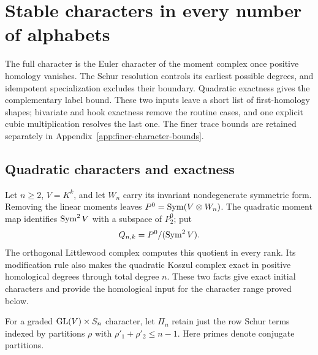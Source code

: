 \section{Stable characters in every number of alphabets}
\label{sec:stable-characters}

The full character is the Euler character of the moment complex once
positive homology vanishes. The Schur resolution controls its earliest
possible degrees, and idempotent specialization excludes their boundary.
Quadratic exactness gives the complementary label bound. These two
inputs leave a short list of first-homology shapes; bivariate and hook
exactness remove the routine cases, and one explicit cubic multiplication
resolves the last one. The finer trace bounds are retained separately in
Appendix~\ref{app:finer-character-bounds}.

\subsection{Quadratic characters and exactness}
\label{sec:quadratic-characters}

Let $n\geq2$, $V=K^k$, and let $W_n$ carry its invariant
nondegenerate symmetric form. Removing the linear moments leaves
$P^0=\operatorname{Sym}(V\otimes W_n)$. The quadratic moment map identifies
$\operatorname{Sym}^2V$ with a subspace of $P^0_2$; put
\[
 Q_{n,k}=P^0/(\operatorname{Sym}^2V).
\]
The orthogonal Littlewood complex computes this quotient in every
rank.  Its modification rule also makes the quadratic Koszul complex
exact in positive homological degrees through total degree $n$.
These two facts give exact initial characters and provide the
homological input for the character range proved below.

For a graded $\operatorname{GL}(V)\times S_n$ character, let $\Pi_n$ retain just
the row Schur terms indexed by partitions $\rho$ with
$\rho'_1+\rho'_2\leq n-1$. Here primes denote conjugate partitions.

